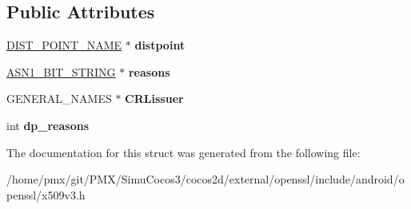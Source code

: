 \subsection*{Public Attributes}
\begin{DoxyCompactItemize}
\item 
\mbox{\label{structDIST__POINT__st_ae76c6517312f3d994038bc83f2d8bcf2}} 
\hyperlink{structDIST__POINT__NAME__st}{D\+I\+S\+T\+\_\+\+P\+O\+I\+N\+T\+\_\+\+N\+A\+ME} $\ast$ {\bfseries distpoint}
\item 
\mbox{\label{structDIST__POINT__st_ae2b557f1533e5a25fb45276d851799d1}} 
\hyperlink{structasn1__string__st}{A\+S\+N1\+\_\+\+B\+I\+T\+\_\+\+S\+T\+R\+I\+NG} $\ast$ {\bfseries reasons}
\item 
\mbox{\label{structDIST__POINT__st_aa2c82f8f59fa660da636bf6a66659f1c}} 
G\+E\+N\+E\+R\+A\+L\+\_\+\+N\+A\+M\+ES $\ast$ {\bfseries C\+R\+Lissuer}
\item 
\mbox{\label{structDIST__POINT__st_a4f2ea5592417459b8d97a97515380a75}} 
int {\bfseries dp\+\_\+reasons}
\end{DoxyCompactItemize}


The documentation for this struct was generated from the following file\+:\begin{DoxyCompactItemize}
\item 
/home/pmx/git/\+P\+M\+X/\+Simu\+Cocos3/cocos2d/external/openssl/include/android/openssl/x509v3.\+h\end{DoxyCompactItemize}
